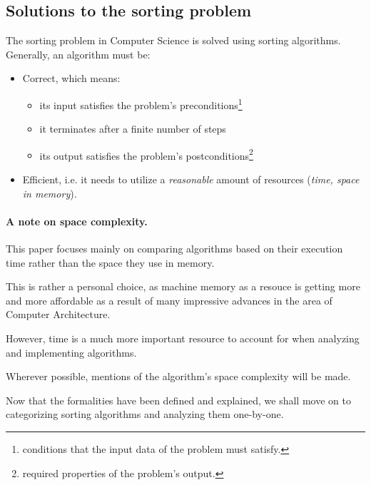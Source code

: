 \documentclass[a4paper]{article}
\begin{document}
    \subsection{Solutions to the sorting problem}

        The sorting problem in Computer Science is solved using sorting algorithms. Generally, an algorithm must be:
        \begin{itemize}
            \item Correct, which means:
                \begin{itemize}
                    \item its input satisfies the problem's preconditions\footnote{conditions that the input data of the problem must satisfy.}\supercite{the_skiena_2010}
                    \item it terminates after a finite number of steps
                    \item its output satisfies the problem's postconditions\footnote{required properties of the problem's output.}\supercite{the_skiena_2010}
                \end{itemize}
            \item Efficient, i.e. it needs to utilize a \emph{reasonable} amount of resources (\emph{time, space in memory}).
        \end{itemize}

        \paragraph{A note on space complexity.} This paper focuses mainly on comparing algorithms based on their execution time rather than the space they use in memory.

        This is rather a personal choice, as machine memory as a resouce is getting more and more affordable as a result of many impressive advances in the area of Computer Architecture. 
        
        However, time is a much more important resource to account for when analyzing and implementing algorithms.
        
        Wherever possible, mentions of the algorithm's space complexity will be made.
        \vspace*{2em}

        \noindent Now that the formalities have been defined and explained, we shall move on to categorizing sorting algorithms and analyzing them one-by-one.
\end{document}
